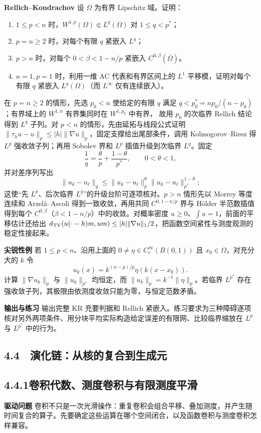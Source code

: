 \documentclass[11pt,a4paper]{ctexart}
\newcommand{\planitem}[1]{\par\smallskip\noindent\textcolor{deepblue}{\textbf{#1}}\quad}
\newcommand{\unithead}[2]{\subsection{#1\quad #2}}
\begin{document}
\planitem{Rellich--Kondrachov}
设 $\Omega$ 为有界 Lipschitz 域。证明：
\begin{enumerate}
\item $1\le p<n$ 时，$W^{1,p}(\Omega)\Subset L^q(\Omega)$ 对 $1\le q<p^*$；
\item $p=n\ge2$ 时，对每个有限 $q$ 紧嵌入 $L^q$；
\item $p>n$ 时，对每个 $0<\beta<1-n/p$ 紧嵌入 $C^{0,\beta}(\overline\Omega)$。
\item $n=1,p=1$ 时，利用一维 AC 代表和有界区间上的 $L^1$ 平移模，证明对每个
有限 $q$ 紧嵌入 $L^q(\Omega)$（而 $L^\infty$ 仅有连续嵌入）。
\end{enumerate}
在 $p=n\ge2$ 的情形，先选 $p_0<n$ 使给定的有限 $q$ 满足
$q<p_0^*=np_0/(n-p_0)$；有界域上的 $W^{1,n}$ 有界集同时在 $W^{1,p_0}$ 中有界，
故用 $p_0$ 的次临界 Rellich 结论得到 $L^q$ 子列。对 $p<n$ 的情形，先由延拓与线段公式证明
$\|\tau_hu-u\|_p\le |h|\|\nabla u\|_p$，固定支撑给出尾部条件，调用 Kolmogorov--Riesz 得 $L^p$ 强收敛子列；再用 Sobolev 界和 $L^p$ 插值升级到次临界 $L^q$。固定
\[
 \frac1q=\frac\theta p+\frac{1-\theta}{p^*},\qquad0<\theta<1,
\]
并对差序列写出
\[
 \|u_k-u_\ell\|_q\le \|u_k-u_\ell\|_p^\theta
 \|u_k-u_\ell\|_{p^*}^{1-\theta};
\]
这使“先 $L^p$、后次临界 $L^q$”的升级台阶可逐项核对。$p>n$ 情形先以 Morrey 等度连续和 Arzel\`a--Ascoli 得到一致收敛，再用共同 $C^{0,1-n/p}$ 界与 H\"older 半范数插值得到每个 $C^{0,\beta}$（$\beta<1-n/p$）中的收敛。对概率密度 $u\ge0$、$\int u=1$，前面的平移估计还给出
$d_{\rm TV}(u(\cdot-h)m,um)\le |h|\|\nabla u\|_1/2$，把函数空间紧性与测度观测的稳定性接起来。

\planitem{尖锐性例}
若 $1\le p<n$、沿用上面的 $0\ne\eta\in C_c^\infty(B(0,1))$ 且 $x_0\in\Omega$，对充分大的 $k$ 令
\[
u_k(x)=k^{(n-p)/p}\eta(k(x-x_0)).
\]
计算 $\|\nabla u_k\|_p$ 与 $\|u_k\|_{p^*}$ 均恒定，而
$\|u_k\|_p=k^{-1}\|\eta\|_p$。若临界 $L^{p^*}$ 存在强收敛子列，其极限由依测度收敛只能为零，与恒定范数矛盾。

\planitem{输出与练习}
输出完整 KR 充要判据和 Rellich 紧嵌入。练习要求为三种障碍逐项核对另外两项条件、用分块平均实际构造给定误差的有限网、比较临界缩放在 $L^p$ 与 $L^{p^*}$ 中的行为。

\subsection*{4.4　演化链：从核的复合到生成元}

\unithead{4.4.1}{卷积代数、测度卷积与有限测度平滑}

\planitem{驱动问题}
卷积不只是一次光滑操作：重复卷积会组合平移、叠加测度，并产生随时间复合的算子。先要确定这些运算在哪个空间闭合，以及函数卷积与测度卷积怎样兼容。
\end{document}
